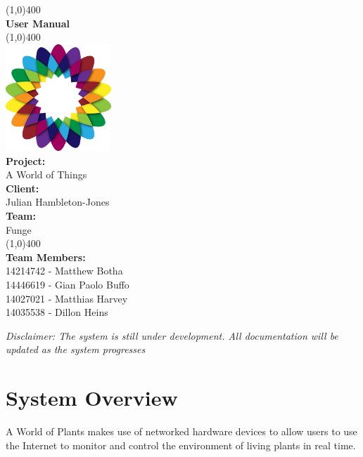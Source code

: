 \documentclass{article}
\begin{document}
\begin{titlepage}
	\begin{center}
		\line(1,0){400}\\
		[6mm]
		\huge{\bfseries User Manual}\\
		\line(1,0){400}\\
		[5mm]
		\includegraphics[width=150px]{../images/AWorldOfPlants.png}
		\\
		[5mm]
		\large\textbf{Project:}\\A World of Things\\
		[3mm]
		\large\textbf{Client:}\\Julian Hambleton-Jones\\
		[3mm]
		\large \textbf{Team:}\\Funge\\
		\line(1,0){400}\\
		[5mm]
		\large \textbf{Team Members:}\\
		[3mm]
		\large 14214742 - Matthew Botha\\
		\large 14446619 - Gian Paolo Buffo\\
		\large 14027021 - Matthias Harvey\\
        \large 14035538 - Dillon Heins\\[3mm]
	\end{center}
\end{titlepage}

\cleardoublepage
\thispagestyle{empty}

\cleardoublepage
\tableofcontents
\cleardoublepage
\setcounter{page}{1}

\textit{Disclaimer: The system is still under development. All documentation will be updated as the system progresses}

\section{System Overview}
	A World of Plants makes use of networked hardware devices to allow users to use the Internet to monitor and control the environment of living plants in real time.
	
\end{document}
